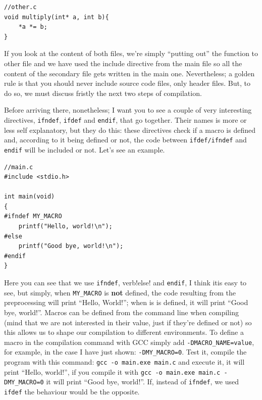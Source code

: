 \documentclass[a4paper]{article}
\begin{document}
\noindent
\begin{minipage}[H]{\linewidth}
\mbox{}
\begin{lstlisting}[style=C,
caption={Example of \texttt{include} directive, included file},
label={lst:include2}]
//other.c
void multiply(int* a, int b){
    *a *= b;
}
\end{lstlisting}
\end{minipage}

If you look at the content of both files, we're simply ``putting out'' the
function to other file and we have used the include directive from the main file
so all the content of the secondary file gets written in the main one.
Nevertheless; a golden rule is that you should never include source code files,
only header files. But, to do so, we must discuss fristly the next two steps
of compilation.

Before arriving there, nonetheless; I want you to see a couple of very
interesting directives, \verb!ifndef!, \verb!ifdef! and \verb!endif!, that go
together. Their names is more or less self explanatory, but they do this: these
directives check if a macro is defined and, according to it being defined or
not, the code between \verb!ifdef/ifndef! and \verb!endif! will be included or
not. Let's see an example.

\noindent
\begin{minipage}[H]{\linewidth}
\mbox{}
\begin{lstlisting}[style=C,
caption={Uso de directivas \texttt{ifdef} e \texttt{ifndef}},
label={lst:ifdefAndIfndef}]
//main.c
#include <stdio.h>

int main(void)
{
#ifndef MY_MACRO
    printf("Hello, world!\n");
#else
    printf("Good bye, world!\n");
#endif
}
\end{lstlisting}
\end{minipage}

Here you can see that we use \verb!ifndef!, verb!else! and \verb!endif!, I think
itis easy to see, but simply, when \verb!MY_MACRO! is \textbf{not} defined,
the code resulting from the preprocessing will print ``Hello, World!''; when is
is defined, it will print ``Good bye, world!''. Macros can be defined from the
command line when compiling (mind that we are not interested in their value,
just if they're defined or not) so this allows us to shape our compilation to
different environments. To define a macro in the compilation command with GCC
simply add \verb!-DMACRO_NAME=value!, for example, in the case I have just
shown: \verb!-DMY_MACRO=0!. Test it, compile the program with this command:
\verb!gcc -o main.exe main.c! and execute it, it will print ``Hello, world!'',
if you compile it with \verb!gcc -o main.exe main.c -DMY_MACRO=0! it will print
``Good bye, world!''. If, instead of \verb!ifndef!, we used \verb!ifdef! the
behaviour would be the opposite.
\end{document}
